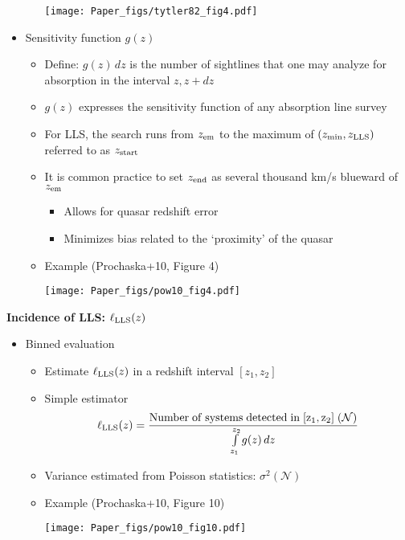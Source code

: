 \documentclass[12pt,letterpaper]{article}
\begin{document}
\begin{Aenumerate}
\begin{itemize}
\begin{itemize}
\texttt{[image: Paper\_figs/tytler82\_fig4.pdf]}

  	\end{itemize}
  \item Sensitivity function $g(z)$
  	\begin{itemize}
  	\item Define: $g(z) \, dz$ is the number of sightlines that one may
  	analyze for absorption in the interval $z, z+dz$
  	\item $g(z)$ expresses the sensitivity function of any absorption line survey
  	\item For LLS, the search runs from $z_{\rm em}$ to the 
  	maximum of $(z_{\rm min}, z_{\rm LLS})$ referred to as $z_{\rm start}$
  	\item It is common practice to set $z_{\rm end}$ as several thousand
  	km/s blueward of $z_{\rm em}$ 
  		\begin{itemize}
  		\item Allows for quasar redshift error 
  		\item Minimizes bias related to the `proximity' of the quasar
  		\end{itemize}
  	\item Example (Prochaska+10, Figure 4)

\texttt{[image: Paper\_figs/pow10\_fig4.pdf]}

  	\end{itemize}


  \end{itemize}	  	


\item {\bf Incidence of LLS: $\ell_{\rm LLS}(z)$}
 \begin{itemize}
 \item Binned evaluation
  	\begin{itemize}
  	\item Estimate $\ell_{\rm LLS}(z)$ in a redshift interval
  	$[z_1,z_2]$
  	\item Simple estimator
  	\begin{equation}
  	\ell_{\rm LLS}(z) = \frac{\rm Number \; of \; systems \; detected \; 
  	in \; [z_1,z_2] \;
  	(\mathcal{N})}{\int\limits_{z_1}^{z_2} g(z) \, dz}
  	\end{equation}
  	\item Variance estimated from Poisson statistics: $\sigma^2 (\mathcal{N})$ 
  	\item Example (Prochaska+10, Figure 10)

\texttt{[image: Paper\_figs/pow10\_fig10.pdf]}


\end{itemize}
\end{itemize}
\end{Aenumerate}
\end{document}
